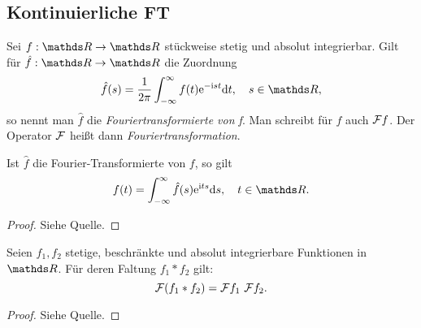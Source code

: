 
\subsection{Kontinuierliche FT}

\begin{defn}
    Sei $f: \R\to\R$ stückweise stetig und absolut integrierbar. Gilt für $\hat{f}: \R\to\R$ die Zuordnung
    \begin{displaymath}
        \hat{f}(s) = \frac{1}{2\pi} \int_{-\infty}^{\infty}  f(t) \ehoch{-{\imag}st} {\diff}t, \quad s\in\R ,
    \end{displaymath}
    so nennt man $\hat{f}$ die \emph{Fouriertransformierte von f}. Man schreibt für $\hat{f}$ auch $\mathcal{F} f$. Der Operator $\mathcal{F}$ heißt dann \emph{Fouriertransformation}.

\end{defn}

\begin{satz}
    Ist $\hat{f}$ die Fourier-Transformierte von $f$, so gilt
    \begin{displaymath}
        f(t) = \int_{-\infty}^{\infty}  \hat{f}(s) \ehoch{{\imag}ts} {\diff}s, \quad t\in\R.
    \end{displaymath}
\end{satz}
\begin{proof}
    Siehe Quelle.
\end{proof}

\begin{satz}
    Seien $f_1,f_2$ stetige, beschränkte und absolut integrierbare Funktionen in $\R$. Für deren Faltung $f_1 * f_2$ gilt:
    \begin{displaymath}
      \mathcal{F}(f_1 * f_2) = \mathcal{F} f_1 ~ \mathcal{F} f_2.
    \end{displaymath}
\end{satz}
\begin{proof}
    Siehe Quelle.
\end{proof}

